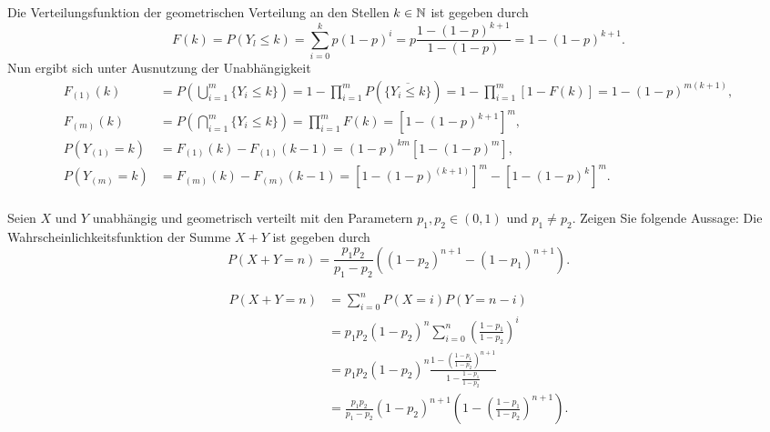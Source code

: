\solution
Die Verteilungsfunktion der geometrischen Verteilung an den Stellen $k\in\mathbb{N}$ ist gegeben durch
\begin{equation*}
  F(k) = P(Y_l \le k) = \sum_{i=0}^{k} p(1-p)^i = p\frac{1-(1-p)^{k+1}}{1-(1-p)} = 1-(1-p)^{k+1}.
\end{equation*}
Nun ergibt sich unter Ausnutzung der Unabhängigkeit
\begin{align*}
    F_{(1)}(k)
    &= P\left(\bigcup_{i=1}^m \{Y_i \le k\}\right)
    = 1 - \prod_{i=1}^m P\left(\overline{\{Y_i \le k\}}\right)
    = 1 - \prod_{i=1}^m \left[1-F(k)\right]
    = 1 - \left( 1-p \right)^{m(k+1)}, \\
    F_{(m)}(k) 
    &= P\left(\bigcap_{i=1}^m \{Y_i \le k\}\right)
    = \prod_{i=1}^m F(k)
    = \left[1-(1-p)^{k+1}\right]^m, \\
    P\left( Y_{(1)} = k \right)
    &= F_{(1)}(k) - F_{(1)}(k-1) 
    = (1-p)^{km}\left[1-(1-p)^m\right], \\
    P\left( Y_{(m)} = k \right)
    &=  F_{(m)}(k) - F_{(m)}(k-1)
    = \left[ 1-(1-p)^{(k+1)} \right]^m - \left[ 1-(1-p)^{k} \right]^m. \\
\end{align*}


 Seien $X$ und $Y$ unabhängig und geometrisch
verteilt mit den Parametern $p_1, p_2 \in (0,1)$ und $p_1\neq p_2$. Zeigen Sie folgende Aussage: 
Die Wahrscheinlichkeitsfunktion der Summe $X+Y$ ist gegeben durch
\begin{equation*}
    P(X+Y = n ) = \frac{p_1 p_2}{p_1 - p_2} \left( (1-p_2)^{n+1}- (1-p_1)^{n+1} \right).  
\end{equation*}

\solution 
\begin{align*}
    P( X+Y = n) &= \sum_{i=0}^{n} P(X=i)P(Y=n-i) \\
    &= p_1 p_2 (1-p_2)^n \sum_{i=0}^{n} \left( \frac{1-p_1}{1-p_2} \right)^{i} \\
    &=  p_1 p_2 (1-p_2)^n \frac{1 - \left( \frac{1-p_1}{1-p_2} \right)^{n+1}}{ 1- \frac{1-p_1}{1-p_2}} \\
    &= \frac{p_1 p_2}{ p_1 -p_2} (1-p_2)^{n+1}\left( 1 - \left( \frac{1-p_1}{1-p_2} \right)^{n+1} \right).
\end{align*}


